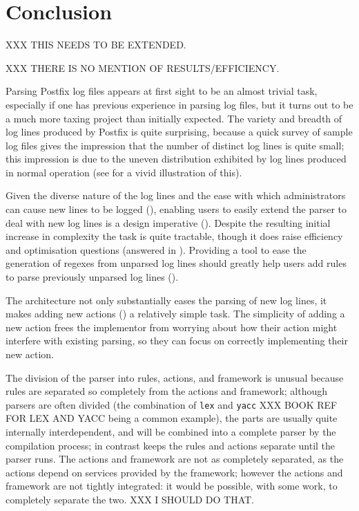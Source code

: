 \section{Conclusion}

\label{conclusion}

XXX THIS NEEDS TO BE EXTENDED\@.

XXX THERE IS NO MENTION OF RESULTS/EFFICIENCY\@.

Parsing Postfix log files appears at first sight to be an almost trivial
task, especially if one has previous experience in parsing log files, but
it turns out to be a much more taxing project than initially expected.  The
variety and breadth of log lines produced by Postfix is quite surprising,
because a quick survey of sample log files gives the impression that the
number of distinct log lines is quite small; this impression is due to the
uneven distribution exhibited by log lines produced in normal operation
(see  for a vivid illustration of this).


Given the diverse nature of the log lines and the ease with which
administrators can cause new lines to be logged (), enabling users to easily extend the parser to deal with new
log lines is a design imperative ().  Despite the
resulting initial increase in complexity the task is quite tractable,
though it does raise efficiency and optimisation questions (answered in
).  Providing a tool to ease the generation
of regexes from unparsed log lines should greatly help users add rules
to parse previously unparsed log lines ().


The architecture not only substantially eases the parsing of new log
lines, it makes adding new actions () a
relatively simple task.  The simplicity of adding a new action frees the
implementor from worrying about how their action might interfere with
existing parsing, so they can focus on correctly implementing their new
action.


The division of the parser into rules, actions, and framework is unusual
because rules are separated so completely from the actions and framework;
although parsers are often divided (the combination of \texttt{lex} and
\texttt{yacc} XXX BOOK REF FOR LEX AND YACC being a common example), the
parts are usually quite internally interdependent, and will be combined
into a complete parser by the compilation process; in contrast
\parsername{} keeps the rules and actions separate until the parser runs.
The actions and framework are not as completely separated, as the actions
depend on services provided by the framework; however the actions and
framework are not tightly integrated: it would be possible, with some work,
to completely separate the two.  XXX I SHOULD DO THAT\@.


